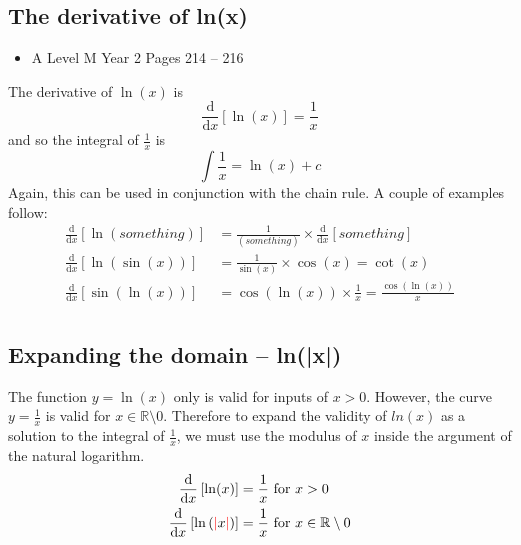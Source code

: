 \documentclass[11pt, a4paper]{article}
\begin{document}
\subsection{The derivative of ln(x)}
\begin{itemize}
\item A Level M Year 2 \hspace{1cm} \phantom{ AS / } Pages 214 -- 216
\end{itemize} \par
The derivative of $\ln(x)$ is
\begin{equation*}
\frac{\mathrm{d}}{\mathrm{d}x}\left[ \ln(x) \right]=\frac{1}{x}
\end{equation*}
and so the integral of $\frac{1}{x}$ is 
\begin{equation*}
\int\frac{1}{x}=\ln(x)+c
\end{equation*}
Again, this can be used in conjunction with the chain rule. A couple of examples follow:
\begin{align*}
\frac{\mathrm{d}}{\mathrm{d}x}\left[ \ln(something) \right]&=\frac{1}{(something)}\times\frac{\mathrm{d}}{\mathrm{d}x}\left[ something \right] \\
\frac{\mathrm{d}}{\mathrm{d}x}\left[ \ln\left(\sin(x)\right) \right]&=\frac{1}{\sin(x)}\times\cos(x)=\cot(x) \\
\frac{\mathrm{d}}{\mathrm{d}x}\left[ \sin\left(\ln(x)\right) \right]&=\cos\left(\ln(x)\right)\times\frac{1}{x}=\frac{\cos\left(\ln(x)\right)}{x} \\
\end{align*}


\subsection{Expanding the domain -- ln(|x|)}
The function $y=\ln(x)$ only is valid for inputs of $x>0$. However, the curve $y=\frac{1}{x}$ is valid for $x\in\mathbb{R}\setminus{0}$. Therefore to expand the validity of $ln(x)$ as a solution to the integral of $\frac{1}{x}$, we must use the modulus of $x$ inside the argument of the natural logarithm.
\begin{align*}
\frac{\mathrm{d}}{\mathrm{d}x}\left[ \ln(x) \right]&=\frac{1}{x} \, \, \text{for } x>0 \\
\frac{\mathrm{d}}{\mathrm{d}x}\left[ \ln\left(\textcolor{red}{|}x\textcolor{red}{|}\right) \right]&=\frac{1}{x} \, \, \text{for } x\in\mathbb{R}\setminus{0} \\
\end{align*}
\end{document}
